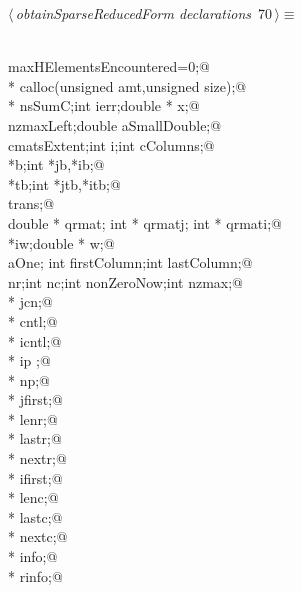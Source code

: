 \documentclass{article}
\begin{document}
\begin{flushleft} \small
\begin{minipage}{\linewidth}\label{scrap107}\raggedright\small
{} $\langle\,${\itshape obtainSparseReducedForm declarations}\nobreak\ {\footnotesize {70}}$\,\rangle\equiv$
\vspace{-1ex}
\begin{list}{}{} \item
\mbox{}\verb@@\\
\mbox{}\verb@int maxHElementsEncountered=0;@\\
\mbox{}\verb@void * calloc(unsigned amt,unsigned size);@\\
\mbox{}\verb@double * nsSumC;int ierr;double * x;@\\
\mbox{}\verb@int nzmaxLeft;double aSmallDouble;@\\
\mbox{}\verb@int cmatsExtent;int i;int cColumns;@\\
\mbox{}\verb@double *b;int *jb,*ib;@\\
\mbox{}\verb@double *tb;int *jtb,*itb;@\\
\mbox{}\verb@int  trans;@\\
\mbox{}\verb@ double * qrmat; int * qrmatj; int * qrmati;@\\
\mbox{}\verb@int *iw;double * w;@\\
\mbox{}\verb@int  aOne; int  firstColumn;int  lastColumn;@\\
\mbox{}\verb@int  nr;int  nc;int nonZeroNow;int nzmax;@\\
\mbox{}\verb@int * jcn;@\\
\mbox{}\verb@double * cntl;@\\
\mbox{}\verb@int * icntl;@\\
\mbox{}\verb@int * ip ;@\\
\mbox{}\verb@int * np;@\\
\mbox{}\verb@int * jfirst;@\\
\mbox{}\verb@int * lenr;@\\
\mbox{}\verb@int * lastr;@\\
\mbox{}\verb@int * nextr;@\\
\mbox{}\verb@int * ifirst;@\\
\mbox{}\verb@int * lenc;@\\
\mbox{}\verb@int * lastc;@\\
\mbox{}\verb@int * nextc;@\\
\mbox{}\verb@int * info;@\\
\mbox{}\verb@double * rinfo;@\\

\end{list}
\end{minipage}
\end{flushleft}
\end{document}
